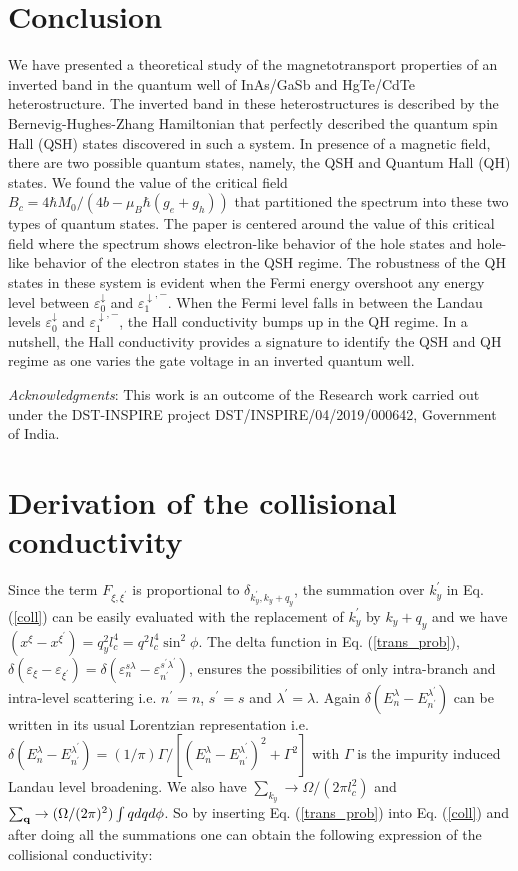 \documentclass[prb,twocolumn]{revtex4-1}
\begin{document}
\section{Conclusion}\label{Sum}
We have presented a theoretical study of the magnetotransport properties of an inverted band in the quantum well of InAs/GaSb and HgTe/CdTe heterostructure. The inverted band in these heterostructures is described by the Bernevig-Hughes-Zhang Hamiltonian that perfectly described the quantum spin Hall (QSH) states discovered in such a system. In presence of a magnetic field, there are two possible quantum states, namely, the QSH and Quantum Hall (QH) states. We found the value of the critical field $B_c=4\hbar M_0/(4b-\mu_B\hbar (g_e+g_h))$ that partitioned the spectrum into these two types of quantum states. The paper is centered around the value of this critical field where the spectrum shows electron-like behavior of the hole states and hole-like behavior of the electron states in the QSH regime. The robustness of the QH states in these system is evident when the Fermi energy overshoot any energy level between $\varepsilon_0^\downarrow$ and $ \varepsilon_1^{\downarrow,-}$. When the Fermi level falls in between the Landau levels $\varepsilon_0^\downarrow$ and $ \varepsilon_1^{\downarrow,-}$, the Hall conductivity bumps up in the QH regime.
In a nutshell, the Hall conductivity provides a signature to identify the QSH and QH regime as one varies the gate voltage in an inverted quantum well.

\textit{Acknowledgments}: This work is an outcome of
the Research work carried out under the DST-INSPIRE project DST/INSPIRE/04/2019/000642, Government of India.

\appendix
\section{Derivation of the collisional conductivity}\label{AppA}
Since the term $F_{\xi,\xi^\prime}$ is proportional to 
$\delta_{k_y^\prime,k_y+q_y}$, the summation over 
$k_y^\prime$ in Eq. (\ref{coll}) can be easily evaluated with the 
replacement of $k_y^\prime$ by $k_y+q_y$ and we have 
$(x^\xi-x^{\xi^\prime})=q_y^2l_c^4=q^2l_c^4\sin^2\phi$. 
The delta function in Eq. (\ref{trans_prob}), 
$\delta (\varepsilon_{\xi}-\varepsilon_{\xi^\prime}) = 
\delta (\varepsilon_n^{s\lambda}-\varepsilon_{n^\prime}^{s^\prime\lambda^\prime})$, 
ensures the possibilities of only intra-branch and 
intra-level scattering i.e. $n^\prime=n$, $s^\prime=s$ and $\lambda^\prime=\lambda$. 
Again $\delta (E_n^\lambda-E_{n^\prime}^{\lambda^\prime})$ can be written
in its usual Lorentzian representation i.e. 
$\delta (E_n^\lambda-E_{n^\prime}^{\lambda^\prime})
=(1/\pi)\Gamma/[(E_n^\lambda-E_{n^\prime}^{\lambda^\prime})^2 + 
\Gamma^2]$  with $\Gamma$ is the impurity induced Landau level broadening. 
We also have $\sum_{k_y}\rightarrow \Omega/(2\pi l_c^2)$ and
$\sum_{{\bf q}}\rightarrow (\Omega/(2\pi)^2)\int qdqd\phi$. So by 
inserting Eq. (\ref{trans_prob}) into Eq. (\ref{coll}) and after doing all 
the summations one can obtain the following expression of the collisional 
conductivity:
\end{document}
